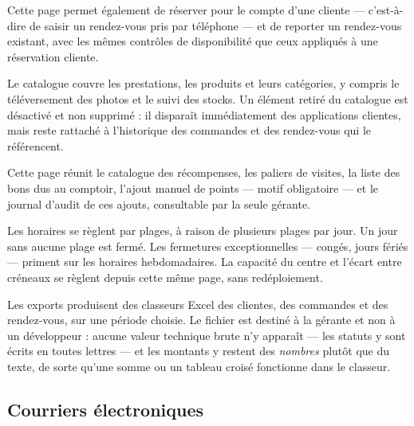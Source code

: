 
Cette page permet également de réserver pour le compte d'une cliente ---
c'est-à-dire de saisir un rendez-vous pris par téléphone --- et de reporter un
rendez-vous existant, avec les mêmes contrôles de disponibilité que ceux
appliqués à une réservation cliente.


Le catalogue couvre les prestations, les produits et leurs catégories, y
compris le téléversement des photos et le suivi des stocks. Un élément retiré
du catalogue est désactivé et non supprimé : il disparaît immédiatement des
applications clientes, mais reste rattaché à l'historique des commandes et des
rendez-vous qui le référencent.


Cette page réunit le catalogue des récompenses, les paliers de visites, la
liste des bons dus au comptoir, l'ajout manuel de points --- motif obligatoire
--- et le journal d'audit de ces ajouts, consultable par la seule gérante.


Les horaires se règlent par plages, à raison de plusieurs plages par jour. Un
jour sans aucune plage est fermé. Les fermetures exceptionnelles --- congés,
jours fériés --- priment sur les horaires hebdomadaires. La capacité du centre
et l'écart entre créneaux se règlent depuis cette même page, sans
redéploiement.



Les exports produisent des classeurs Excel des clientes, des commandes et des
rendez-vous, sur une période choisie. Le fichier est destiné à la gérante et
non à un développeur : aucune valeur technique brute n'y apparaît --- les
statuts y sont écrits en toutes lettres --- et les montants y restent des
\emph{nombres} plutôt que du texte, de sorte qu'une somme ou un tableau croisé
fonctionne dans le classeur.

\subsection{Courriers électroniques}

